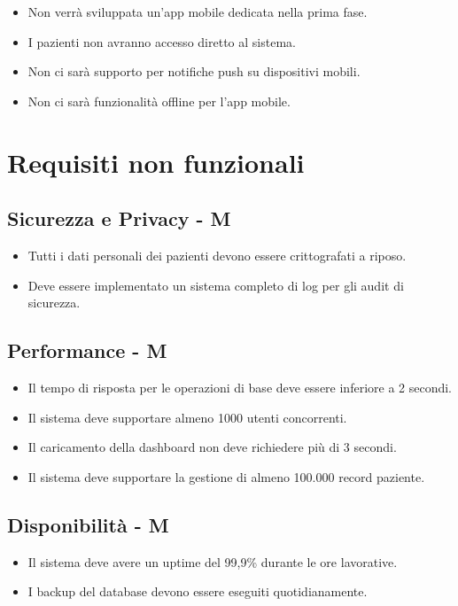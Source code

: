 \documentclass[12pt,a4paper,oneside]{report}
\begin{document}
\begin{itemize}
    \item Non verrà sviluppata un'app mobile dedicata nella prima fase.
    \item I pazienti non avranno accesso diretto al sistema.
    \item Non ci sarà supporto per notifiche push su dispositivi mobili.
    \item Non ci sarà funzionalità offline per l'app mobile.
\end{itemize}


\section{Requisiti non funzionali}

\subsection{Sicurezza e Privacy - M}

\begin{itemize}
    \item Tutti i dati personali dei pazienti devono essere crittografati a riposo.
    \item Deve essere implementato un sistema completo di log per gli audit di sicurezza.
\end{itemize}

\subsection{Performance  - M}

\begin{itemize}
    \item Il tempo di risposta per le operazioni di base deve essere inferiore a 2 secondi.
    \item Il sistema deve supportare almeno 1000 utenti concorrenti.
    \item Il caricamento della dashboard non deve richiedere più di 3 secondi.
    \item Il sistema deve supportare la gestione di almeno 100.000 record paziente.
\end{itemize}

\subsection{Disponibilità  - M}

\begin{itemize}
    \item Il sistema deve avere un uptime del 99,9\% durante le ore lavorative.
    \item I backup del database devono essere eseguiti quotidianamente.
\end{itemize}
\end{document}
